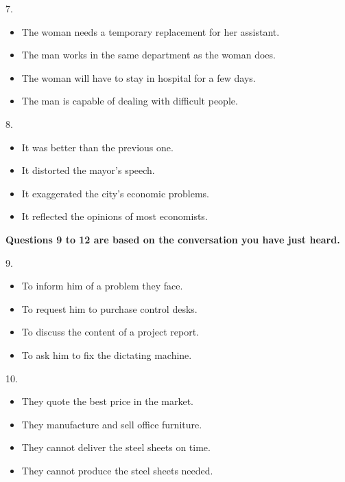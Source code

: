 \documentclass[UTF8,11pt]{ctexart}
\begin{document}
7.


\begin{itemize}[leftmargin=2em,itemsep=.2em,topsep=.4em]\item[A.] The woman needs a temporary replacement for her assistant.
\item[B.] The man works in the same department as the woman does.
\end{itemize}

\begin{itemize}[leftmargin=2em,itemsep=.2em,topsep=.4em]\item[C.] The woman will have to stay in hospital for a few days.
\item[D.] The man is capable of dealing with difficult people.
\end{itemize}

8.


\begin{itemize}[leftmargin=2em,itemsep=.2em,topsep=.4em]\item[A.] It was better than the previous one.
\item[B.] It distorted the mayor’s speech.
\item[C.] It exaggerated the city’s economic problems.
\item[D.] It reflected the opinions of most economists.
\end{itemize}

\textbf{Questions 9 to 12 are based on the conversation you have just heard.}


9.


\begin{itemize}[leftmargin=2em,itemsep=.2em,topsep=.4em]\item[A.] To inform him of a problem they face.
\item[B.] To request him to purchase control desks.
\item[C.] To discuss the content of a project report.
\item[D.] To ask him to fix the dictating machine.
\end{itemize}

10.


\begin{itemize}[leftmargin=2em,itemsep=.2em,topsep=.4em]\item[A.] They quote the best price in the market.
\item[B.] They manufacture and sell office furniture.
\item[C.] They cannot deliver the steel sheets on time.
\item[D.] They cannot produce the steel sheets needed.
\end{itemize}
\end{document}
